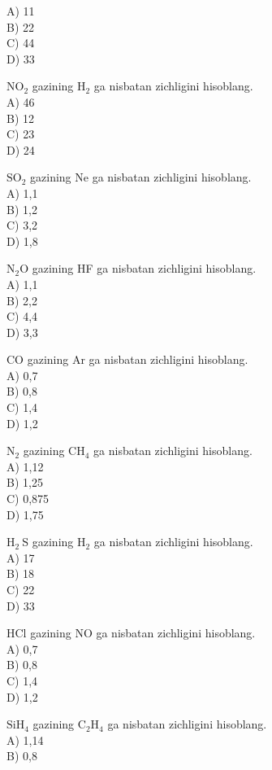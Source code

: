 A) 11\\
B) 22\\
C) 44\\
D) 33
  \item $\mathrm{NO}_{2}$ gazining $\mathrm{H}_{2}$ ga nisbatan zichligini hisoblang.\\
A) 46\\
B) 12\\
C) 23\\
D) 24
  \item $\mathrm{SO}_{2}$ gazining Ne ga nisbatan zichligini hisoblang.\\
A) 1,1\\
B) 1,2\\
C) 3,2\\
D) 1,8
  \item $\mathrm{N}_{2} \mathrm{O}$ gazining HF ga nisbatan zichligini hisoblang.\\
A) 1,1\\
B) 2,2\\
C) 4,4\\
D) 3,3
  \item CO gazining Ar ga nisbatan zichligini hisoblang.\\
A) 0,7\\
B) 0,8\\
C) 1,4\\
D) 1,2
  \item $\mathrm{N}_{2}$ gazining $\mathrm{CH}_{4}$ ga nisbatan zichligini hisoblang.\\
A) 1,12\\
B) 1,25\\
C) 0,875\\
D) 1,75
  \item $\mathrm{H}_{2} \mathrm{~S}$ gazining $\mathrm{H}_{2}$ ga nisbatan zichligini hisoblang.\\
A) 17\\
B) 18\\
C) 22\\
D) 33
  \item HCl gazining NO ga nisbatan zichligini hisoblang.\\
A) 0,7\\
B) 0,8\\
C) 1,4\\
D) 1,2
  \item $\mathrm{SiH}_{4}$ gazining $\mathrm{C}_{2} \mathrm{H}_{4}$ ga nisbatan zichligini hisoblang.\\
A) 1,14\\
B) 0,8\\
